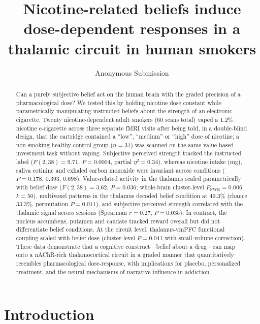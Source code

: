 \documentclass[11pt]{article}
\title{Nicotine-related beliefs induce dose-dependent responses in a thalamic circuit in human smokers}
\author[1]{Anonymous Submission}
\affil[1]{Target venue: \textit{Nature Human Behaviour}}
\date{}
\begin{document}
\maketitle

\begin{abstract}
Can a purely subjective belief act on the human brain with the graded precision of a pharmacological dose? We tested this by holding nicotine dose constant while parametrically manipulating instructed beliefs about the strength of an electronic cigarette. Twenty nicotine-dependent adult smokers (60 scans total) vaped a 1.2\% nicotine e-cigarette across three separate fMRI visits after being told, in a double-blind design, that the cartridge contained a ``low'', ``medium'' or ``high'' dose of nicotine; a non-smoking healthy-control group ($n=31$) was scanned on the same value-based investment task without vaping. Subjective perceived strength tracked the instructed label ($F(2,38)=9.71$, $P=0.0004$, partial $\eta^2=0.34$), whereas nicotine intake (mg), saliva cotinine and exhaled carbon monoxide were invariant across conditions ($P=0.178$, $0.393$, $0.698$). Value-related activity in the thalamus scaled parametrically with belief dose ($F(2,38)=3.62$, $P=0.036$; whole-brain cluster-level $P_\text{FWE}=0.006$, $k=50$), multivoxel patterns in the thalamus decoded belief condition at 49.3\% (chance 33.3\%, permutation $P=0.011$), and subjective perceived strength correlated with the thalamic signal across sessions (Spearman $r=0.27$, $P=0.035$). In contrast, the nucleus accumbens, putamen and caudate tracked reward overall but did not differentiate belief conditions. At the circuit level, thalamus-vmPFC functional coupling scaled with belief dose (cluster-level $P=0.041$ with small-volume correction). These data demonstrate that a cognitive construct---belief about a drug---can map onto a nAChR-rich thalamocortical circuit in a graded manner that quantitatively resembles pharmacological dose-response, with implications for placebo, personalized treatment, and the neural mechanisms of narrative influence in addiction.
\end{abstract}

\section{Introduction}
\end{document}
